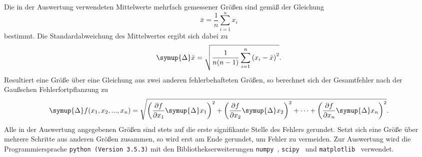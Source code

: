 Die in der Auswertung verwendeten Mittelwerte mehrfach gemessener Größen sind
gemäß der Gleichung
%
\begin{equation}
    \bar{x}=\frac{1}{n}\sum_{i=1}^n x_i
    \label{eq:mittelwert}
\end{equation}
%
bestimmt. Die Standardabweichung des Mittelwertes ergibt sich dabei zu
%
\begin{equation}
    \symup{\Delta}\bar{x}=\sqrt{\frac{1}{n(n-1)}\sum_{i=1}^n\left(x_i-\bar{x}\right)^2}.
    \label{eq:standardabweichung}
\end{equation}
%
Resultiert eine Größe über eine Gleichung aus zwei anderen fehlerbehafteten
Größen, so berechnet sich der Gesamtfehler nach der Gaußschen
Fehlerfortpflanzung zu
%
\begin{equation}
    \symup{\Delta}f(x_1,x_2,...,x_n)=\sqrt{\left(\frac{\partial f}{\partial x_1}\symup{\Delta}x_1\right)^2+\left(\frac{\partial f}{\partial x_2}\symup{\Delta}x_2\right)^2+ \dotsb +\left(\frac{\partial f}{\partial x_n}\symup{\Delta}x_n\right)^2}.
    \label{eq:fehlerfortpflanzung}
\end{equation}
%
Alle in der Auswertung angegebenen Größen sind stets auf die erste signifikante
Stelle des Fehlers gerundet. Setzt sich eine Größe über mehrere Schritte aus
anderen Größen zusammen, so wird erst am Ende gerundet, um Fehler zu vermeiden.
Zur Auswertung wird die Programmiersprache \texttt{python (Version 3.5.3)} mit
den Bibliothekserweiterungen \texttt{numpy}~\cite{numpy},
\texttt{scipy}~\cite{scipy} und \texttt{matplotlib}~\cite{matplotlib} verwendet.
